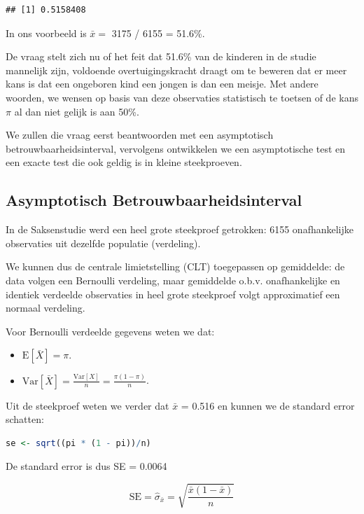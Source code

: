 \documentclass[
  12pt,dutch,coursenotes]{book}
\providecommand{\tightlist}{%
  \setlength{\itemsep}{0pt}\setlength{\parskip}{0pt}}
\begin{document}
\begin{lstlisting}
## [1] 0.5158408
\end{lstlisting}

In ons voorbeeld is \(\bar x =\) 3175 / 6155 = 51.6\%.

De vraag stelt zich nu of het feit dat 51.6\% van de kinderen in de studie mannelijk zijn, voldoende overtuigingskracht draagt om te beweren dat er meer kans is dat een ongeboren kind een jongen is dan een meisje. Met andere woorden, we wensen op basis van deze observaties statistisch te toetsen of de kans \(\pi\) al dan niet gelijk is aan 50\%.

We zullen die vraag eerst beantwoorden met een asymptotisch betrouwbaarheidsinterval, vervolgens ontwikkelen we een asymptotische test en een exacte test die ook geldig is in kleine steekproeven.

\hypertarget{asymptotisch-betrouwbaarheidsinterval}{%
\subsection{Asymptotisch Betrouwbaarheidsinterval}\label{asymptotisch-betrouwbaarheidsinterval}}

In de Saksenstudie werd een heel grote steekproef getrokken: 6155 onafhankelijke observaties uit dezelfde populatie (verdeling).

We kunnen dus de centrale limietstelling (CLT) toegepassen op gemiddelde:
de data volgen een Bernoulli verdeling, maar gemiddelde o.b.v. onafhankelijke en identiek verdeelde observaties in heel grote steekproef volgt approximatief een normaal verdeling.

Voor Bernoulli verdeelde gegevens weten we dat:

\begin{itemize}
\tightlist
\item
  \(\text{E}[\bar X] = \pi\).
\item
  \(\text{Var}[\bar X] = \frac{\text{Var}[X]}{n} = \frac{\pi(1-\pi)}{n}\).
\end{itemize}

Uit de steekproef weten we verder dat \(\bar x\) = 0.516 en kunnen we de standard error schatten:

\begin{lstlisting}[language=R]
se <- sqrt((pi * (1 - pi))/n)
\end{lstlisting}

De standard error is dus SE = 0.0064

\[
\text{SE} = \hat\sigma_{\bar x} = \sqrt{\frac{\bar x(1-\bar x)}{n}} \]
\end{document}
